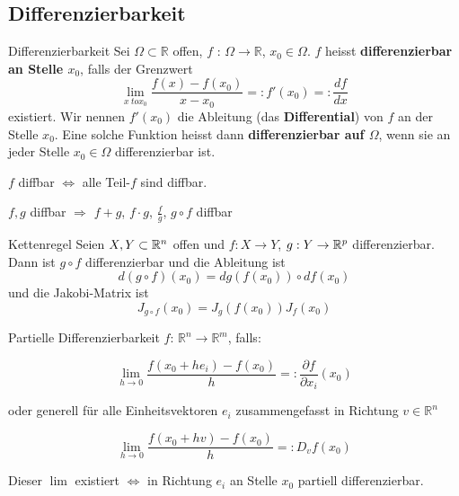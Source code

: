 
\subsection{Differenzierbarkeit}

\begin{Definition}{Differenzierbarkeit}{}
    Sei $\Omega \subset \mathbb{R}$ offen, $f$ : $\Omega \to \mathbb{R}$, $x_0\in\Omega$. $f$ heisst \textbf{differenzierbar an Stelle $x_0$}, falls der Grenzwert
    \[
    \lim_{x\ to x_0} \frac{f(x) - f(x_0)}{x - x_0} =:
    f'(x_0) =:
    \frac{df}{dx}
    \]
    existiert. Wir nennen $f'(x_0)$ die Ableitung (das \textbf{Differential}) von $f$ an der Stelle $x_0$. Eine solche Funktion heisst dann \textbf{differenzierbar auf $\Omega$}, wenn sie an jeder Stelle $x_0 \in \Omega$ differenzierbar ist.
\end{Definition}

$f$ diffbar $\Leftrightarrow$ alle Teil-$f$ sind diffbar.

$f,g$ diffbar $\Rightarrow$ $f+g$, $f \cdot g$, $\frac{f}{g}$, $g \circ f$ diffbar

\begin{Satz}{Kettenregel}{}
	Seien $X,Y \subset \mathbb{R}^n$ offen und $f: X \to Y$, $g: Y \to \mathbb{R}^p$ differenzierbar. Dann ist $g \circ f$ differenzierbar und die Ableitung ist \[d(g\circ f)(x_0) = dg(f(x_0))\circ df(x_0)\] und die Jakobi-Matrix ist \[J_{g\circ f}(x_0) = J_g(f(x_0))J_f(x_0)\]
\end{Satz}


\begin{Definition}{Partielle Differenzierbarkeit}{}
	$f$: $\mathbb{R}^n \rightarrow \mathbb{R}^m$, falls:

	\[
    	\lim_{h \rightarrow 0} \frac{f(x_0 + h e_i)-f(x_0)}{h} =: \frac{\partial f}{\partial x_i}(x_0)
	\]

	oder generell für alle Einheitsvektoren $e_i$ zusammengefasst in Richtung $v \in \mathbb{R}^n$

	\[
    	\lim_{h \rightarrow 0} \frac{f(x_0 + h v)-f(x_0)}{h} =: D_v f(x_0)
	\]

	Dieser $\lim$ existiert $\Leftrightarrow$ in Richtung $e_i$ an Stelle $x_0$ partiell differenzierbar.
\end{Definition}

